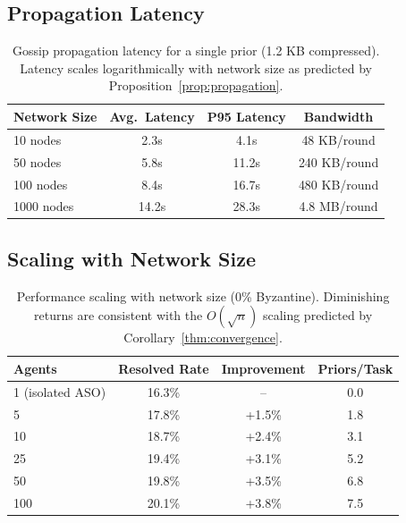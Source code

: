\documentclass[11pt]{article}
\begin{document}
\subsection{Propagation Latency}

\begin{table}[h]
\centering
\begin{tabular}{lccc}
\toprule
Network Size & Avg.\ Latency & P95 Latency & Bandwidth \\
\midrule
10 nodes & 2.3s & 4.1s & 48 KB/round \\
50 nodes & 5.8s & 11.2s & 240 KB/round \\
100 nodes & 8.4s & 16.7s & 480 KB/round \\
1000 nodes & 14.2s & 28.3s & 4.8 MB/round \\
\bottomrule
\end{tabular}
\caption{Gossip propagation latency for a single prior (1.2 KB compressed).
Latency scales logarithmically with network size as predicted by
Proposition~\ref{prop:propagation}.}
\label{tab:latency}
\end{table}

\subsection{Scaling with Network Size}

\begin{table}[h]
\centering
\begin{tabular}{lccc}
\toprule
Agents & Resolved Rate & Improvement & Priors/Task \\
\midrule
1 (isolated ASO) & 16.3\% & -- & 0.0 \\
5 & 17.8\% & +1.5\% & 1.8 \\
10 & 18.7\% & +2.4\% & 3.1 \\
25 & 19.4\% & +3.1\% & 5.2 \\
50 & 19.8\% & +3.5\% & 6.8 \\
100 & 20.1\% & +3.8\% & 7.5 \\
\bottomrule
\end{tabular}
\caption{Performance scaling with network size (0\% Byzantine). Diminishing
returns are consistent with the $O(\sqrt{n})$ scaling predicted by
Corollary~\ref{thm:convergence}.}
\label{tab:scaling}
\end{table}

\end{document}

